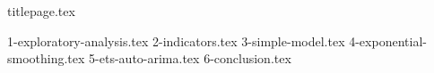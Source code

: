 \documentclass[10pt]{report}
\begin{document}
	{titlepage.tex}

	\tableofcontents
	\clearpage %
	\newpage

	{1-exploratory-analysis.tex}
	{2-indicators.tex}
	{3-simple-model.tex}
	{4-exponential-smoothing.tex}
	{5-ets-auto-arima.tex}
	{6-conclusion.tex}
\end{document}
